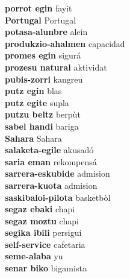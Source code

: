 \textbf{ porrot egin  } fayit \\
\textbf{ Portugal  } Portugal \\
\textbf{ potasa-alunbre  } alein \\
\textbf{ produkzio-ahalmen  } capacidad \\
\textbf{ promes egin  } sigurá \\
\textbf{ prozesu natural  } aktividat \\
\textbf{ pubis-zorri  } kangreu \\
\textbf{ putz egin  } blas \\
\textbf{ putz egite  } supla \\
\textbf{ putzu beltz  } berpùt \\
\textbf{ sabel handi  } bariga \\
\textbf{ Sahara  } Sahara \\
\textbf{ salaketa-egile  } akusadó \\
\textbf{ saria eman  } rekompensá \\
\textbf{ sarrera-eskubide  } admision \\
\textbf{ sarrera-kuota  } admision \\
\textbf{ saskibaloi-pilota  } basketbòl \\
\textbf{ segaz ebaki  } chapi \\
\textbf{ segaz moztu  } chapi \\
\textbf{ segika ibili  } persiguí \\
\textbf{ self-service  } cafetaria \\
\textbf{ seme-alaba  } yu \\
\textbf{ senar biko  } bigamista \\

